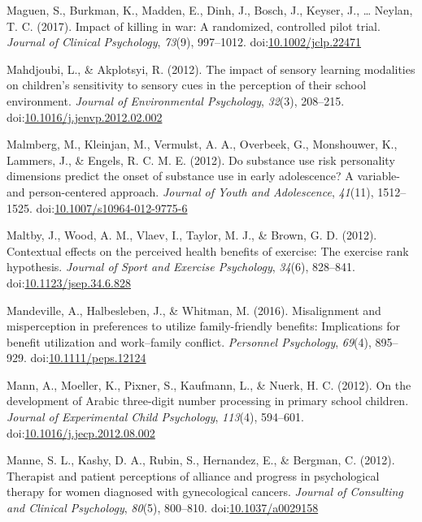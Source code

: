 \documentclass[english,man]{apa6}
\theoremstyle{definition}
\theoremstyle{definition}
\theoremstyle{definition}
\theoremstyle{remark}
\begin{document}
\hypertarget{ref-Maguen2017}{}
Maguen, S., Burkman, K., Madden, E., Dinh, J., Bosch, J., Keyser, J.,
\ldots{} Neylan, T. C. (2017). Impact of killing in war: A randomized,
controlled pilot trial. \emph{Journal of Clinical Psychology},
\emph{73}(9), 997--1012.
doi:\href{https://doi.org/10.1002/jclp.22471}{10.1002/jclp.22471}

\hypertarget{ref-Mahdjoubi2012}{}
Mahdjoubi, L., \& Akplotsyi, R. (2012). The impact of sensory learning
modalities on children's sensitivity to sensory cues in the perception
of their school environment. \emph{Journal of Environmental Psychology},
\emph{32}(3), 208--215.
doi:\href{https://doi.org/10.1016/j.jenvp.2012.02.002}{10.1016/j.jenvp.2012.02.002}

\hypertarget{ref-Malmberg2012}{}
Malmberg, M., Kleinjan, M., Vermulst, A. A., Overbeek, G., Monshouwer,
K., Lammers, J., \& Engels, R. C. M. E. (2012). Do substance use risk
personality dimensions predict the onset of substance use in early
adolescence? A variable- and person-centered approach. \emph{Journal of
Youth and Adolescence}, \emph{41}(11), 1512--1525.
doi:\href{https://doi.org/10.1007/s10964-012-9775-6}{10.1007/s10964-012-9775-6}

\hypertarget{ref-Maltby2012}{}
Maltby, J., Wood, A. M., Vlaev, I., Taylor, M. J., \& Brown, G. D.
(2012). Contextual effects on the perceived health benefits of exercise:
The exercise rank hypothesis. \emph{Journal of Sport and Exercise
Psychology}, \emph{34}(6), 828--841.
doi:\href{https://doi.org/10.1123/jsep.34.6.828}{10.1123/jsep.34.6.828}

\hypertarget{ref-Mandeville2016}{}
Mandeville, A., Halbesleben, J., \& Whitman, M. (2016). Misalignment and
misperception in preferences to utilize family-friendly benefits:
Implications for benefit utilization and work--family conflict.
\emph{Personnel Psychology}, \emph{69}(4), 895--929.
doi:\href{https://doi.org/10.1111/peps.12124}{10.1111/peps.12124}

\hypertarget{ref-Mann2012}{}
Mann, A., Moeller, K., Pixner, S., Kaufmann, L., \& Nuerk, H. C. (2012).
On the development of Arabic three-digit number processing in primary
school children. \emph{Journal of Experimental Child Psychology},
\emph{113}(4), 594--601.
doi:\href{https://doi.org/10.1016/j.jecp.2012.08.002}{10.1016/j.jecp.2012.08.002}

\hypertarget{ref-Manne2012}{}
Manne, S. L., Kashy, D. A., Rubin, S., Hernandez, E., \& Bergman, C.
(2012). Therapist and patient perceptions of alliance and progress in
psychological therapy for women diagnosed with gynecological cancers.
\emph{Journal of Consulting and Clinical Psychology}, \emph{80}(5),
800--810. doi:\href{https://doi.org/10.1037/a0029158}{10.1037/a0029158}
\end{document}
